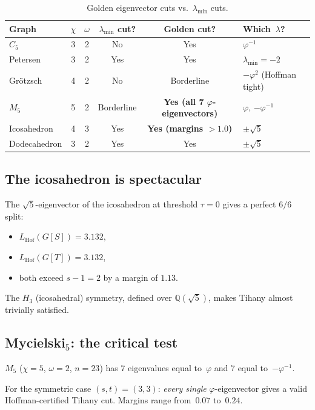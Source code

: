 \documentclass[11pt,a4paper]{amsart}
\theoremstyle{plain}
\theoremstyle{definition}
\theoremstyle{remark}
\newcommand{\Q}{\mathbb{Q}}
\newcommand{\vp}{\varphi}
\newcommand{\chr}{\chi}
\newcommand{\om}{\omega}
\newcommand{\LHof}{L_{\mathrm{Hof}}}
\begin{document}
\begin{table}[ht]
\centering
\caption{Golden eigenvector cuts vs.\ $\lambda_{\min}$ cuts.}
\label{tab:cuts}
\begin{tabular}{@{}lccccl@{}}
\toprule
Graph & $\chr$ & $\om$ & $\lambda_{\min}$ cut? & Golden cut? & Which~$\lambda$? \\
\midrule
$C_5$         & 3 & 2 & No  & Yes & $\vp^{-1}$ \\
Petersen      & 3 & 2 & Yes & Yes & $\lambda_{\min}=-2$ \\
Gr\"otzsch    & 4 & 2 & No  & Borderline & $-\vp^2$ (Hoffman tight) \\
$M_5$         & 5 & 2 & Borderline & \textbf{Yes (all 7 $\vp$-eigenvectors)} & $\vp$, $-\vp^{-1}$ \\
Icosahedron   & 4 & 3 & Yes & \textbf{Yes (margins $> 1.0$)} & $\pm\sqrt{5}$ \\
Dodecahedron  & 3 & 2 & Yes & Yes & $\pm\sqrt{5}$ \\
\bottomrule
\end{tabular}
\end{table}

\subsection{The icosahedron is spectacular}

The $\sqrt{5}$-eigenvector of the icosahedron at threshold $\tau = 0$ gives a
perfect $6/6$ split:
\begin{itemize}
\item $\LHof(G[S]) = 3.132$,
\item $\LHof(G[T]) = 3.132$,
\item both exceed $s-1 = 2$ by a margin of $1.13$.
\end{itemize}
The $H_3$ (icosahedral) symmetry, defined over $\Q(\sqrt{5})$, makes Tihany
almost trivially satisfied.

\subsection{Mycielski\texorpdfstring{$_5$}{₅}: the critical test}

$M_5$ ($\chr = 5$, $\om = 2$, $n = 23$) has $7$ eigenvalues equal to~$\vp$ and
$7$ equal to~$-\vp^{-1}$.

For the symmetric case $(s,t) = (3,3)$: \emph{every single} $\vp$-eigenvector
gives a valid Hoffman-certified Tihany cut.  Margins range from~$0.07$
to~$0.24$.
\end{document}
